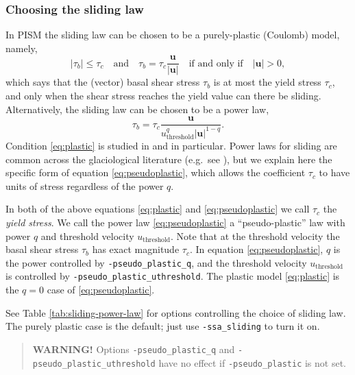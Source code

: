 \subsubsection*{Choosing the sliding law}  In PISM the sliding law can be chosen to be a purely-plastic (Coulomb) model, namely,
\begin{equation}
   |\tau_b| \le \tau_c \quad \text{and} \quad \tau_b = \tau_c \frac{\mathbf{u}}{|\mathbf{u}|} \quad\text{if and only if}\quad |\mathbf{u}| > 0,
\label{eq:plastic}
\end{equation}
which says that the (vector) basal shear stress $\tau_b$ is at most the yield stress $\tau_c$, and only when the shear stress reaches the yield value can there be sliding.  Alternatively, the sliding law can be chosen to be a power law,
\begin{equation}
\tau_b = \tau_c \frac{\mathbf{u}}{u_{\text{threshold}}^q |\mathbf{u}|^{1-q}}.
\label{eq:pseudoplastic}
\end{equation}
Condition \eqref{eq:plastic} is studied in \cite{SchoofStream} and \cite{SchoofTill} in particular.  Power laws for sliding are common across the glaciological literature (e.g.~see \cite{CuffeyPaterson,GreveBlatter2009}), but we explain here the specific form of equation \eqref{eq:pseudoplastic}, which allows the coefficient $\tau_c$ to have units of stress regardless of the power $q$.

In both of the above equations \eqref{eq:plastic} and \eqref{eq:pseudoplastic} we call $\tau_c$ the \emph{yield stress}.  We call the power law \eqref{eq:pseudoplastic} a ``pseudo-plastic'' law with power $q$ and threshold velocity $u_{\text{threshold}}$.  Note that at the threshold velocity the basal shear stress $\tau_b$ has exact magnitude $\tau_c$.  In equation \eqref{eq:pseudoplastic}, $q$ is the power controlled by \texttt{-pseudo_plastic_q}, and the threshold velocity $u_{\text{threshold}}$ is controlled by \texttt{-pseudo_plastic_uthreshold}.  The plastic model \eqref{eq:plastic} is the $q=0$ case of \eqref{eq:pseudoplastic}.

See Table \ref{tab:sliding-power-law} for options controlling the choice of sliding law. The purely plastic case is the default; just use \texttt{-ssa_sliding} to turn it on.

\begin{quote}
  \textbf{WARNING!} Options \texttt{-pseudo_plastic_q} and \texttt{-pseudo_plastic_uthreshold} have no effect if \texttt{-pseudo_plastic} is not set.
\end{quote}

